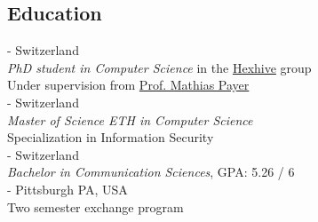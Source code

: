 \documentclass[mm, 11pt]{simple_style}
\begin{document}
\begin{resume}
\section{Education}
 - Switzerland  \\
{\sl PhD student in Computer Science} in the \href{hexhive.epfl.ch}{Hexhive} group\\
Under supervision from \href{nebelwelt.net}{Prof. Mathias Payer}\\
 - Switzerland \\
{\sl Master of Science ETH in Computer Science}\\
Specialization in Information Security\\
 - Switzerland  \\
{\sl Bachelor in Communication Sciences}, GPA: 5.26 / 6\\
 - Pittsburgh PA, USA \\
Two semester exchange program\\
\sectionline

\end{resume}
\end{document}
